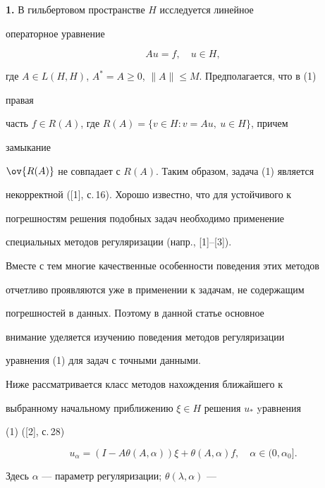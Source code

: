 \label{begin} 


 


 


{\bf 1.} В гильбертовом пространстве $H$ исследуется линейное 


операторное уравнение 


\begin{equation} 


A u=f,\quad u\in H, 


\end{equation} 


где $A\in L(H,H)$, $A^*=A\ge0$, $\|A\|\le M$. Предполагается, что в (1) 


правая 


часть $f\in R(A)$, где $R(A)=\{v\in H:v=A u,\ u\in H\}$, причем 


замыкание 


$\ov{R(A)}$ не совпадает с $R(A)$. Таким образом, задача (1) является 


некорректной ([1], с.\,16). Хорошо известно, что для устойчивого к 


погрешностям решения подобных задач необходимо применение 


специальных методов регуляризации (напр., [1]--[3]). 


Вместе с тем многие качественные особенности поведения этих методов 


отчетливо проявляются уже в применении к задачам, не содержащим 


погрешностей в данных. Поэтому в данной статье основное 


внимание уделяется изучению поведения методов регуляризации 


уравнения (1) для задач с точными данными. 


 


Ниже рассматривается класс методов нахождения ближайшего к 


выбранному начальному приближению $\xi\in H$ решения $u_*$ yравнения 


(1) ([2], с.\,28) 


\begin{equation} 


u_\alpha=(I-A\theta(A,\alpha))\xi+\theta(A,\alpha)f,\quad 


\alpha\in(0,\alpha_0]. 


\end{equation} 


Здесь $\alpha$ --- параметр регуляризации; $\theta(\lambda,\alpha)$ --- 


